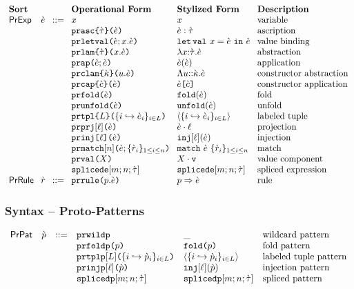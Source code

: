 \[\arraycolsep=4pt\begin{array}{lllllll}
\textbf{Sort} & & & \textbf{Operational Form} & \textbf{Stylized Form} & \textbf{Description}\\
\mathsf{PrExp} & \ce & ::= & x & x & \text{variable}\\
&&& \aceasc{\ctau}{\ce} & \asc{\ce}{\ctau} & \text{ascription}\\
&&& \aceletsyn{x}{\ce}{\ce} & \letsyn{x}{\ce}{\ce} & \text{value binding}\\
&&& \acelam{\ctau}{x}{\ce} & \lam{x}{\ctau}{\ce} & \text{abstraction}\\
&&& \aceap{\ce}{\ce} & \ap{\ce}{\ce} & \text{application}\\
&&& \aceclam{\cekappa}{u}{\ce} & \clam{u}{\cekappa}{\ce} & \text{constructor abstraction}\\
&&& \acecap{\ce}{\cec} & \cAp{\ce}{\cec} & \text{constructor application}\\
&&& \acefold{\ce} & \fold{\ce} & \text{fold}\\
&&& \aceunfold{\ce} & \unfold{\ce} & \text{unfold}\\
&&& \acetpl{\labelset}{\mapschema{\ce}{i}{\labelset}} & \tpl{\mapschema{\ce}{i}{\labelset}} & \text{labeled tuple}\\
&&& \acepr{\ell}{\ce} & \prj{\ce}{\ell} & \text{projection}\\
&&& \aceanain{\ell}{\ce} & \inj{\ell}{\ce} & \text{injection}\\
&&& \acematchwith{n}{\ce}{\seqschemaX{\crv}} & \matchwith{\ce}{\seqschemaX{\crv}} & \text{match}\\
&&& \acemval{X} & \mval{X} & \text{value component}\\
&&& \acesplicede{m}{n}{\ctau} & \splicede{m}{n}{\ctau} & \text{spliced expression}\\%
\mathsf{PrRule} & \crv & ::= & \acematchrule{p}{\ce} & \matchrule{p}{\ce} & \text{rule}\end{array}\]

\subsubsection{Syntax -- Proto-Patterns}
\[\begin{array}{lllllll}
\mathsf{PrPat} & \cpv & ::= & \acewildp & \wildp & \text{wildcard pattern}\\
&&& \acefoldp{p} & \foldp{p} & \text{fold pattern}\\
&&& \acetplp{\labelset}{\mapschema{\cpv}{i}{\labelset}} & \tplp{\mapschema{\cpv}{i}{\labelset}} & \text{labeled tuple pattern}\\
&&& \aceinjp{\ell}{\cpv} & \injp{\ell}{\cpv} & \text{injection pattern}\\
&&& \acesplicedp{m}{n}{\ctau} & \splicedp{m}{n}{\ctau} & \text{spliced pattern} %
\end{array}\]

